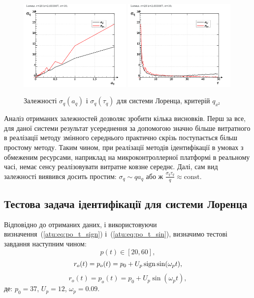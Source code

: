 \begin{figure}[ht!]
\begin{center}
  \includegraphics[width=0.49\textwidth]{p/cha/lor/lor_qx2_tau-p_aq_sd.png}
  \hfill
  \includegraphics[width=0.49\textwidth]{p/cha/lor/lor_qx2_tau-p_tau_sd.png}
\end{center}
  \caption{Залежності $ \sigma_{q} (a_q) $ і $ \sigma_{q} (\tau_q) $ для системи Лоренца, критерій $q_{x^2}$}
\label{atu:f:lor_qx2_tau}
\end{figure}

Аналіз отриманих залежностей дозволяє зробити кілька
висновків. Перш за все, для даної системи результат усереднення
за допомогою значно більше витратного в реалізації
методу змінного середнього практично скрізь поступається
більш простому методу. Таким чином, при реалізації методів
ідентифікації в умовах з обмеженим ресурсами, наприклад на
микроконтроллерної платформі в реальному часі, немає сенсу
реалізовувати витратне ковзне середнє. Далі, сам вид
залежності виявився досить простим:
$ \sigma_q \sim q a_q $ або ж
$ \frac{\sigma_q \tau_q}{q} \approx \mathrm{const}$.



\subsection{Тестова задача ідентифікації для системи Лоренца}%

Відповідно до отриманих даних, і використовуючи
визначення~(\ref{atu:eq:po_t_sign}) і~(\ref{atu:eq:po_t_sin}),
%
визначимо тестові завдання наступним чином:
\[
  p(t) \in [20, 60],
\]
%
\begin{equation}
  r_o(t) = p_o(t) = p_0 +  U_{p} \operatorname*{sign} \sin( \omega_{p} t ),
  \label{atu:eq:lor_po_t_sign}
\end{equation}
%
%
\begin{equation}
  r_o(t) = p_o(t) = p_0 +  U_{p} \sin( \omega_{p} t ),
  \label{atu:eq:lor_po_t_sin}
\end{equation}
%
де:
$p_0 = 37$, $U_p=12$, $\omega_p=0.09$.

